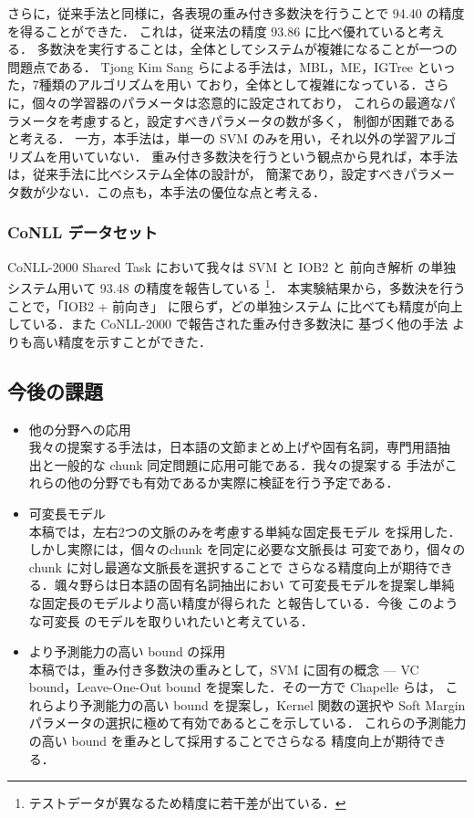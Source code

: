 さらに，従来手法と同様に，各表現の重み付き多数決を行うことで 94.40 の精度を得ることができた．
これは，従来法の精度 93.86 に比べ優れていると考える．
多数決を実行することは，全体としてシステムが複雑になることが一つの問題点である．
Tjong Kim Sang らによる手法は，MBL，ME，IGTree といった，7種類のアルゴリズムを用い
ており，全体として複雑になっている．さらに，個々の学習器のパラメータは恣意的に設定されており，
これらの最適なパラメータを考慮すると，設定すべきパラメータの数が多く，
制御が困難であると考える． 一方，本手法は，単一の SVM のみを用い，それ以外の学習アルゴリズムを用いていない．
重み付き多数決を行うという観点から見れば，本手法は，従来手法に比べシステム全体の設計が，
簡潔であり，設定すべきパラメータ数が少ない．この点も，本手法の優位な点と考える．

\subsubsection{CoNLL データセット}
CoNLL-2000 Shared Task において我々は SVM と IOB2 と 前向き解析 
の単独システム用いて 93.48 の精度を報告している \cite{kudo2000a}
 \footnote{テストデータが異なるため精度に若干差が出ている．}．
本実験結果から，多数決を行うことで，「IOB2 + 前向き」 に限らず，どの単独システム
に比べても精度が向上している．また CoNLL-2000 で報告された重み付き多数決に
基づく他の手法\cite{Tjong_Kim_Sang2000d} よりも高い精度を示すことができた．

\subsection{今後の課題}
\begin{itemize}
 \item 他の分野への応用\\
       我々の提案する手法は，日本語の文節まとめ上げや固有名詞，専門用語抽
       出と一般的な chunk 同定問題に応用可能である．我々の提案する
       手法がこれらの他の分野でも有効であるか実際に検証を行う予定である．

 \item 可変長モデル\\
       本稿では，左右2つの文脈のみを考慮する単純な固定長モデル
       を採用した．しかし実際には，個々のchunk を同定に必要な文脈長は
       可変であり，個々の chunk に対し最適な文脈長を選択することで
       さらなる精度向上が期待できる．颯々野らは日本語の固有名詞抽出におい
       て可変長モデルを提案し単純な固定長のモデルより高い精度が得られた
       と報告している\cite{Sassano00b}．今後 このような可変長
       のモデルを取りいれたいと考えている．
       
 \item より予測能力の高い bound の採用\\
       本稿では，重み付き多数決の重みとして，SVM に固有の概念 --- VC
       bound，Leave-One-Out bound を提案した．その一方で Chapelle らは，
       これらより予測能力の高い bound を提案し，Kernel 関数の選択や 
       Soft Margin パラメータの選択に極めて有効であるとこを示している\cite{ChaVap00}．
       これらの予測能力の高い bound を重みとして採用することでさらなる
       精度向上が期待できる．
\end{itemize}

